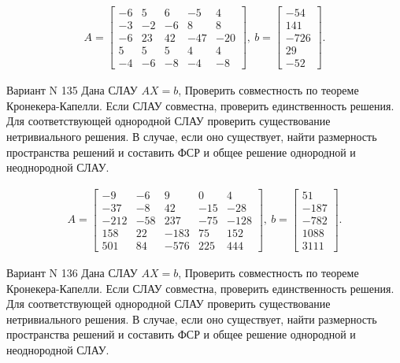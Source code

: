 \documentclass[11pt]{report}
\begin{document}
\begin{align*}
 A = \left[\begin{matrix}-6 & 5 & 6 & -5 & 4\\-3 & -2 & -6 & 8 & 8\\-6 & 23 & 42 & -47 & -20\\5 & 5 & 5 & 4 & 4\\-4 & -6 & -8 & -4 & -8\end{matrix}\right],
\ b = \left[\begin{matrix}-54\\141\\-726\\29\\-52\end{matrix}\right]. 
 \end{align*}

Вариант N 135
Дана СЛАУ $AX = b$,
Проверить совместность по теореме Кронекера-Капелли. Если СЛАУ совместна, проверить единственность решения.
Для соответствующей однородной СЛАУ проверить существование нетривиального решения. В случае, если оно существует,
найти размерность пространства решений и составить ФСР и общее решение однородной  и неоднородной СЛАУ.


\begin{align*}
 A = \left[\begin{matrix}-9 & -6 & 9 & 0 & 4\\-37 & -8 & 42 & -15 & -28\\-212 & -58 & 237 & -75 & -128\\158 & 22 & -183 & 75 & 152\\501 & 84 & -576 & 225 & 444\end{matrix}\right],
\ b = \left[\begin{matrix}51\\-187\\-782\\1088\\3111\end{matrix}\right]. 
 \end{align*}

Вариант N 136
Дана СЛАУ $AX = b$,
Проверить совместность по теореме Кронекера-Капелли. Если СЛАУ совместна, проверить единственность решения.
Для соответствующей однородной СЛАУ проверить существование нетривиального решения. В случае, если оно существует,
найти размерность пространства решений и составить ФСР и общее решение однородной  и неоднородной СЛАУ.
\end{document}
